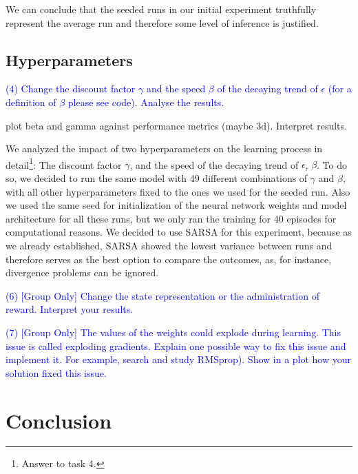 \documentclass[conference]{IEEEtran}
\begin{document}
We can conclude that the seeded runs in our initial experiment truthfully represent the average run and therefore some level of inference is justified.


\subsection{Hyperparameters}



\textcolor{blue}{(4) Change the discount factor $\gamma$ and the speed $\beta$ of the decaying trend of $\epsilon$ (for a definition of $\beta$ please see code). Analyse the results.}

plot beta and gamma against performance metrics (maybe 3d). Interpret results.

We analyzed the impact of two hyperparameters on the learning process in detail\footnote{Answer to task 4.}: The discount factor $\gamma$, and the speed of the decaying trend of $\epsilon$, $\beta$. To do so, we decided to run the same model with 49 different combinations of $\gamma$ and $\beta$, with all other hyperparameters fixed to the ones we used for the seeded run. Also we used the same seed for initialization of the neural network weights and model architecture for all these runs, but we only ran the training for 40 episodes for computational reasons. We decided to use SARSA for this experiment, because as we already established, SARSA showed the lowest variance between runs and therefore serves as the best option to compare the outcomes, as, for instance, divergence problems can be ignored.

\begin{figure}
    \centering
\end{figure}


\textcolor{blue}{(6) [Group Only] Change the state representation or the administration of reward. Interpret your results.}

\textcolor{blue}{(7) [Group Only] The values of the weights could explode during learning. This
issue is called exploding gradients. Explain one possible way to fix this issue and
implement it. For example, search and study RMSprop). Show in a plot how your
solution fixed this issue.}








\section{Conclusion}\label{sec:conclusion}
\end{document}

